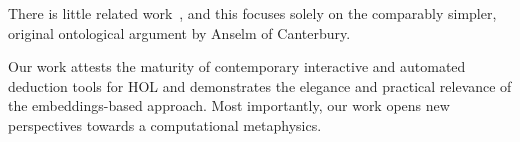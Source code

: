 \documentclass{llncs}
\begin{document}
There is little related work~\cite{oppenheimera11,rushby13}, and this focuses solely on the comparably simpler,
original ontological argument by Anselm of Canterbury.  %

Our work attests the maturity of contemporary interactive and
automated deduction tools for HOL and
demonstrates the elegance and practical relevance of the
embeddings-based approach. Most importantly, our work opens new
perspectives towards a computational metaphysics.




%
\end{document}
